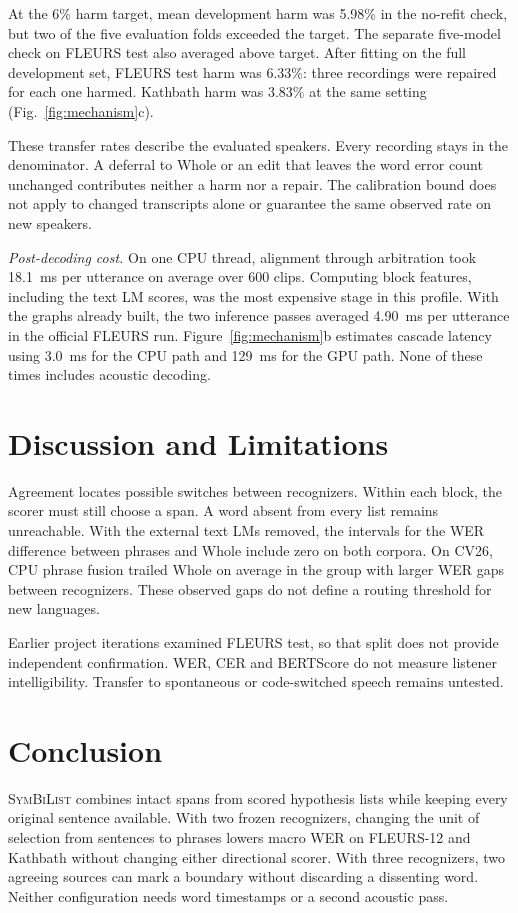\documentclass[conference,letterpaper]{IEEEtran}
\newcommand{\SymBiList}{\textup{\textsc{SymBiList}}}
\begin{document}
At the 6\% harm target, mean development harm was 5.98\% in the no-refit check, but two of the five evaluation folds exceeded the target. The separate five-model check on FLEURS test also averaged above target. After fitting on the full development set, FLEURS test harm was 6.33\%: three recordings were repaired for each one harmed. Kathbath harm was 3.83\% at the same setting (Fig.~\ref{fig:mechanism}c).

These transfer rates describe the evaluated speakers. Every recording stays in the denominator. A deferral to Whole or an edit that leaves the word error count unchanged contributes neither a harm nor a repair. The calibration bound does not apply to changed transcripts alone or guarantee the same observed rate on new speakers.

\emph{Post-decoding cost.} On one CPU thread, alignment through arbitration took 18.1~ms per utterance on average over 600 clips. Computing block features, including the text LM scores, was the most expensive stage in this profile. With the graphs already built, the two inference passes averaged 4.90~ms per utterance in the official FLEURS run. Figure~\ref{fig:mechanism}b estimates cascade latency using 3.0~ms for the CPU path and 129~ms for the GPU path. None of these times includes acoustic decoding.

\section{Discussion and Limitations}
Agreement locates possible switches between recognizers. Within each block, the scorer must still choose a span. A word absent from every list remains unreachable. With the external text LMs removed, the intervals for the WER difference between phrases and Whole include zero on both corpora. On CV26, CPU phrase fusion trailed Whole on average in the group with larger WER gaps between recognizers. These observed gaps do not define a routing threshold for new languages.

Earlier project iterations examined FLEURS test, so that split does not provide independent confirmation. WER, CER and BERTScore do not measure listener intelligibility. Transfer to spontaneous or code-switched speech remains untested.

\section{Conclusion}
\SymBiList{} combines intact spans from scored hypothesis lists while keeping every original sentence available. With two frozen recognizers, changing the unit of selection from sentences to phrases lowers macro WER on FLEURS-12 and Kathbath without changing either directional scorer. With three recognizers, two agreeing sources can mark a boundary without discarding a dissenting word. Neither configuration needs word timestamps or a second acoustic pass.
\end{document}
